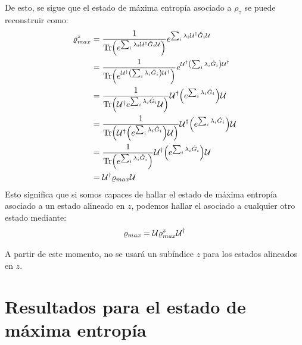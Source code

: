De esto, se sigue que el estado de máxima entropía asociado a $\rho_{z}$ se puede reconstruir como:
\begin{align*}
\varrho_{max}^{z}&=\frac{1}{\Tr(e^{\sum_{i}\lambda_{i}\mathcal{U}^{\dag}\hat{G}_{i}\mathcal{U}})}e^{\sum_{i}\lambda_{i}\mathcal{U}^{\dag}\hat{G}_{i}\mathcal{U}}\\
&=\frac{1}{\Tr(e^{\mathcal{U}^{\dag}\qty(\sum_{i}\lambda_{i}\hat{G}_{i})\mathcal{U}^{\dag}})}e^{\mathcal{U}^{\dag}\qty(\sum_{i}\lambda_{i}\hat{G}_{i})\mathcal{U}^{\dag}}\\
&=\frac{1}{\Tr(\mathcal{U}^{\dag}e^{\sum_{i}\lambda_{i}\hat{G}_{i}}\mathcal{U})}\mathcal{U}^{\dag}\qty(e^{\sum_{i}\lambda_{i}\hat{G}_{i}})\mathcal{U}\\
&=\frac{1}{\Tr(\mathcal{U}^{\dag}\qty(e^{\sum_{i}\lambda_{i}\hat{G}_{i}})\mathcal{U})}\mathcal{U}^{\dag}\qty(e^{\sum_{i}\lambda_{i}\hat{G}_{i}})\mathcal{U}\\
&=\frac{1}{\Tr(e^{\sum_{i}\lambda_{i}\hat{G}_{i}})}\mathcal{U}^{\dag}\qty(e^{\sum_{i}\lambda_{i}\hat{G}_{i}})\mathcal{U}\\
&=\mathcal{U}^{\dag}\varrho_{max}\mathcal{U}
\end{align*}
Esto significa que si somos capaces de hallar el estado de máxima entropía asociado a un estado alineado en $z$, podemos hallar el asociado a cualquier otro estado mediante:
\begin{equation}
\varrho_{max}=\mathcal{U}\varrho_{max}^{z}\mathcal{U}^{\dag}
\end{equation}

A partir de este momento, no se usará un subíndice $z$ para los estados alineados en $z$.

\newpage

\section{Resultados para el estado de máxima entropía}

